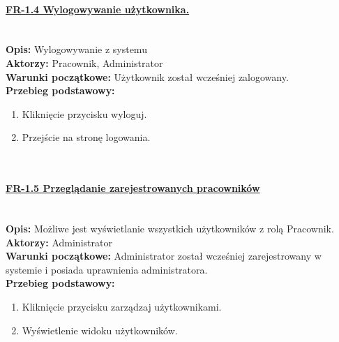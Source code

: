 \paragraph{\underline{FR-1.4 Wylogowywanie użytkownika.}}\mbox{}\\[1mm]
	\noindent\textbf{Opis:} Wylogowywanie z systemu\\
	\noindent\textbf{Aktorzy:} Pracownik, Administrator\\
	\textbf{Warunki początkowe:} Użytkownik został wcześniej zalogowany.\\
	\textbf{Przebieg podstawowy:}
	\begin{enumerate}[noparskip]
		\item Kliknięcie przycisku wyloguj.
		\item Przejście na stronę logowania.
	\end{enumerate} \mbox{}\\[-11mm]

\paragraph{\underline{FR-1.5 Przeglądanie zarejestrowanych pracowników}}\mbox{}\\[1mm]
	\noindent\textbf{Opis:} Możliwe jest wyświetlanie wszystkich użytkowników z rolą Pracownik.\\
	\noindent\textbf{Aktorzy:} Administrator\\
	\textbf{Warunki początkowe:} Administrator został wcześniej zarejestrowany w systemie i posiada uprawnienia administratora.\\
	\textbf{Przebieg podstawowy:}
	\begin{enumerate}[noparskip]
		\item Kliknięcie przycisku zarządzaj użytkownikami.
		\item Wyświetlenie widoku użytkowników.
	\end{enumerate} \mbox{}\\[-11mm]

